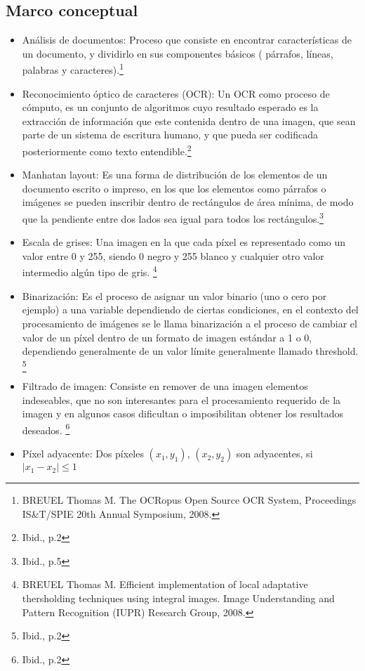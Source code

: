 \documentclass[a4paper, 11pt, oneside]{article}
\begin{document}
	\subsection{Marco conceptual}
	\begin{itemize}
    \item Análisis de documentos: Proceso que consiste en encontrar características de un documento,
    y dividirlo en sus componentes básicos ( párrafos, líneas, palabras y caracteres).\footnote{
	BREUEL Thomas M. The OCRopus Open Source OCR System, Proceedings IS\&T/SPIE 20th Annual Symposium, 2008.}
    \item Reconocimiento óptico de caracteres (OCR): Un OCR como proceso de cómputo, es un conjunto de
    algoritmos cuyo resultado esperado es la extracción de información  que este contenida dentro de
    una imagen, que sean parte de un sistema de escritura humano, y que pueda ser codificada
    posteriormente como texto entendible.\footnote{Ibid., p.2}
    \item Manhatan layout: Es una forma de distribución de los elementos de un documento escrito o
    impreso, en los que los elementos como párrafos o imágenes se pueden inscribir
    dentro de rectángulos de área mínima, de modo que la pendiente entre dos lados sea igual para
    todos los rectángulos.\footnote{Ibid., p.5}
    \item Escala de grises: Una imagen en la que cada píxel es representado como un valor entre 0 y
    255, siendo 0 negro y 255 blanco y cualquier otro valor intermedio algún tipo de gris. \footnote{
    BREUEL Thomas M. Efficient implementation of local adaptative thersholding techniques using integral 
    images. Image Understanding and Pattern Recognition (IUPR) Research Group, 2008.}
    \item Binarización:	Es el proceso de asignar un valor binario (uno o cero por ejemplo) a una
    variable dependiendo de	ciertas condiciones, en el contexto del procesamiento de imágenes se le
    llama binarización a el proceso de cambiar el valor de un píxel dentro de un formato de imagen
    estándar a 1 o 0, dependiendo generalmente de un valor límite generalmente llamado threshold.
    \footnote{Ibid., p.2}
    \item Filtrado de imagen: Consiste en remover de una imagen elementos indeseables, que no
    son interesantes para el procesamiento requerido de la imagen y en algunos casos dificultan
    o imposibilitan obtener los resultados deseados.
    \footnote{Ibid., p.2}
    \item Píxel adyacente: Dos píxeles $(x_1,y_1)$, $(x_2,y_2)$ son adyacentes, si $|x_1-x_2| \le 1$

\end{itemize}
\end{document}
